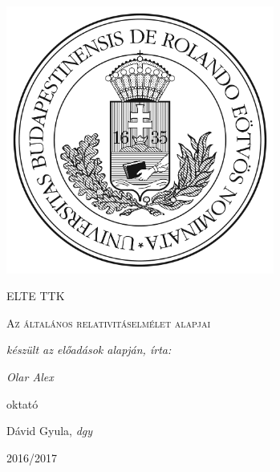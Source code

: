 \documentclass[a4paper, 12pt]{article}
\begin{document}
\begin{titlepage}

	\centering
	\includegraphics[width=0.66\textwidth]{elte.jpg}\par\vspace{1cm}
	{\scshape\LARGE ELTE TTK \par}
	\vspace{2cm}
	{\scshape\Large Az általános relativitáselmélet alapjai\par}
	\vspace{1.5cm}
	{\large\itshape készült az előadások alapján, írta: \par}
	\vspace{1cm}
	{\large\itshape Olar Alex\par}
	\vfill
	oktató\par
	\vspace{0.5cm}
	{\Large Dávid Gyula, \itshape{dgy}}

	\vfill

	{\large 2016/2017 \par}
\end{titlepage}

\begin{abstract}
Ez a jegyzet \itshape{Dávid Gyula} előadássorozata alapján készült a 2016/17-es tanév második féléveben. A jegyzet bővítése tervben van. Az előadássorozat 3 féléven keresztül végig kíséri a most II. évfolyamot egészen a BSc végéig. Ezen összefoglaló célja számomra az ismétlés, majd közkinccsé tétel. 
\end{abstract}

\vfill

\tableofcontents
\end{document}
